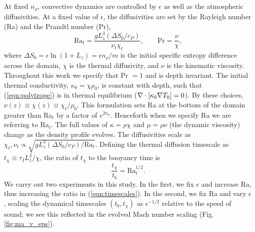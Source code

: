 At fixed $n_\rho$, convective dynamics are 
controlled by $\epsilon$ as well as the atmospheric diffusivities.
At a fixed value of
$\epsilon$, the diffusivities are set by the
Rayleigh number (Ra) and the Prandtl number (Pr),
\begin{equation}
\text{Ra}_{t} = \frac{g L_z^3 (\Delta S_0 / c_P)}{\nu_t\chi_t},
\qquad
\text{Pr} = \frac{\nu}{\chi},
\end{equation}
where $\Delta S_0 = \epsilon\ln (1 + L_z) = \epsilon n_\rho / m$ 
is the initial specific entropy difference across the domain,
$\chi$ is the thermal diffusivity, 
and $\nu$ is the kinematic viscosity.
Throughout this work we specify
that Pr $= 1$ and is depth invariant.
The initial thermal
conductivity, $\kappa_0 = \chi \rho_0$, is
constant with depth, such that (\ref{eqn:polytrope}) is in
thermal equilibrium ($\nabla\cdot[\kappa_0\nabla T_0] = 0$).
By these
choices, $\nu(z) \equiv \chi(z) \equiv \chi_t / \rho_0$.
This formulation 
sets Ra at the bottom of the domain greater than
Ra$_t$ by a factor of $e^{2n_\rho}$. Henceforth
when we specify Ra we are referring to Ra$_t$.  
The full values of $\kappa = \rho\chi$ and 
$\mu = \rho\nu$ (the dynamic viscosity) change as the density 
profile evolves.  
The diffusivities scale as
$\chi_t, \nu_t \propto \sqrt{g L_z^3 (\Delta S_0 / c_P) / \text{Ra}_t}$.
Defining the thermal diffusion timescale as $t_\chi \equiv \tau_IL_z^2 / \chi$, the
ratio of $t_\chi$ to the buoyancy time is
\begin{equation}
\frac{t_\chi}{t_b} =\text{Ra}_t^{1/2}.
\label{eqn:timescales}
\end{equation}
We carry out two experiments in this study. In the first,
we fix $\epsilon$ and increase Ra, thus increasing the ratio in
(\ref{eqn:timescales}). In the second, we fix Ra and vary $\epsilon$,
scaling the dynamical timescales $(t_b, t_\chi)$ as $\epsilon^{-1/2}$
relative to the speed of sound; we see this reflected in the evolved Mach
number scaling (Fig. \ref{fig:ma_v_eps}).

